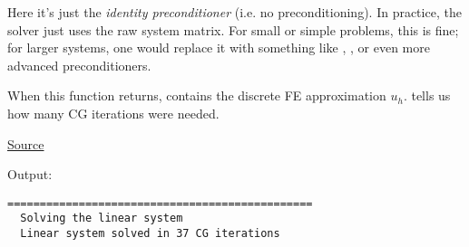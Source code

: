 \begin{itemize}
\begin{itemize}
        Here it's just the \emph{identity preconditioner} (i.e. no preconditioning). In practice, the solver just uses the raw system matrix. For small or simple problems, this is fine; for larger systems, one would replace it with something like , , or even more advanced preconditioners.
    \end{itemize}
    When this function returns,  contains the discrete FE approximation $u_{h}$.  tells us how many CG iterations were needed.
\end{itemize}

\begin{center}
    \href{https://gist.github.com/AndreVale69/f04f312da68d16c253f46493ae7eaf24#file-poisson1d-cpp}{ Source}
    \hspace{1em}
\end{center}

\noindent
Output:
\begin{lstlisting}
===============================================
  Solving the linear system
  Linear system solved in 37 CG iterations\end{lstlisting}